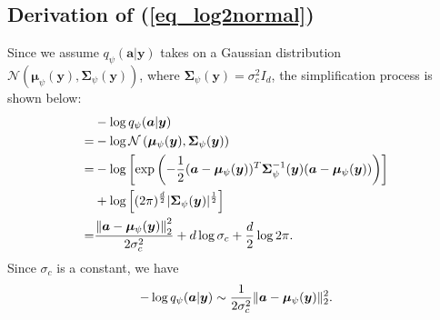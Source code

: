 \begin{appendices}
\section{Derivation of (\ref{eq_log2normal})}
\label{apd:derivation_log}
Since we assume $q_{\psi}(\bm{a}|\bm{y})$ takes on a Gaussian distribution $\mathcal{N}(\bm{\mu}_{\psi}(\bm{y}), \bm{\Sigma}_{\psi}(\bm{y}))$, where $\bm{\Sigma}_{\psi}(\bm{y})=\sigma_{c}^{2}I_{d}$, the simplification process is shown below: 
\begin{align}
&-\log{q_{\psi}(\bm{a}|\bm{y})} \notag\\
=& -\log{\mathcal{N}\left(\bm{\mu}_{\psi}(\bm{y}), \bm{\Sigma}_{\psi}(\bm{y})\right)} \notag\\
=& -\log\left[
\exp\left(-{\frac{1}{2}}(\bm{a}-\bm{\mu}_{\psi}(\bm{y}))^{T}\bm{\Sigma}_{\psi}^{-1}(\bm{y})(\bm{a}-\bm{\mu}_{\psi}(\bm{y}))   \right)\right] \notag\\
& + \log\left[(2\pi)^{\frac{d}{2}}|\bm{\Sigma}_{\psi}(\bm{y})|^{\frac{1}{2}} \right] \notag\\
=& \frac{\left\|\bm{a}-\bm{\mu}_{\psi}(\bm{y})\right\|^2_2}{2\sigma^{2}_{c}}  
+ d\log\sigma_{c} + \frac{d}{2}\log{2\pi}. \notag
\end{align}
Since $\sigma_{c}$ is a constant, we have 
\begin{align}
    -\log{q_{\psi}(\bm{a}|\bm{y})}\sim \frac{1}{2\sigma^2_{c}}\|\bm{a}-\bm{\mu}_{\psi}(\bm{y}) \|^2_2. \notag
\end{align}


\end{appendices}

